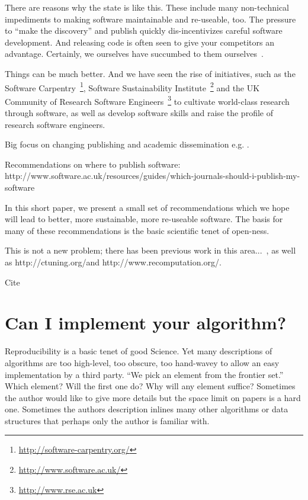 \documentclass[conference]{IEEEtran}
\begin{document}
There are reasons why the state is like this. These include many
non-technical impediments to making software maintainable and
re-useable, too. The pressure to ``make the discovery'' and publish
quickly dis-incentivizes careful software development. And releasing
code is often seen to give your competitors an advantage. 
Certainly, we ourselves have succumbed to them
ourselves~\cite{crick-et-al:2009, SLAyer2011}.


Things can be much better. And we have seen the rise of initiatives,
such as the Software
Carpentry~\footnote{\url{http://software-carpentry.org/}}, Software
Sustainability Institute~\footnote{\url{http://www.software.ac.uk/}}
and the UK Community of Research Software
Engineers~\footnote{\url{http://www.rse.ac.uk}} to cultivate
world-class research through software, as well as develop software
skills and raise the profile of research software engineers.



Big focus on changing publishing and academic dissemination
e.g. \cite{stodden-et-al:2013,fursin+dubach:2014}.

Recommendations on where to publish software:
http://www.software.ac.uk/resources/guides/which-journals-should-i-publish-my-software


In this short paper, we present a small set of recommendations which
we hope will lead to better, more sustainable, more re-useable
software. The basis for many of these recommendations is the basic
scientific tenet of open-ness.

This is not a new problem; there has been previous work in this
area...~\cite{sim-et-al:2003,chirigati-et-al:2013}, as well as
http://ctuning.org/and http://www.recomputation.org/.

Cite~\cite{collberg-et-al:2014}


\section{Can I implement your algorithm?}


Reproducibility is a basic tenet of good Science. Yet many
descriptions of algorithms are too high-level, too obscure, too
hand-wavey to allow an easy implementation by a third party. ``We pick
an element from the frontier set.'' Which element? Will the first one
do? Why will any element suffice? Sometimes the author would like to
give more details but the space limit on papers is a hard
one. Sometimes the authors description inlines many other algorithms
or data structures that perhaps only the author is familiar with.
\end{document}
